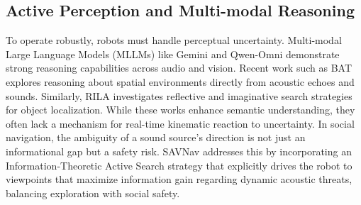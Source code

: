 \subsection{Active Perception and Multi-modal Reasoning}
To operate robustly, robots must handle perceptual uncertainty. Multi-modal Large Language Models (MLLMs) like Gemini \cite{Gemini31Pro2026} and Qwen-Omni \cite{Qwen3omniTechnicalReport2025} demonstrate strong reasoning capabilities across audio and vision. Recent work such as BAT \cite{BATLearningReason2024} explores reasoning about spatial environments directly from acoustic echoes and sounds. Similarly, RILA \cite{RILAReflectiveImaginative2024} investigates reflective and imaginative search strategies for object localization.
While these works enhance semantic understanding, they often lack a mechanism for real-time kinematic reaction to uncertainty. In social navigation, the ambiguity of a sound source's direction is not just an informational gap but a safety risk. SAVNav addresses this by incorporating an Information-Theoretic Active Search strategy that explicitly drives the robot to viewpoints that maximize information gain regarding dynamic acoustic threats, balancing exploration with social safety.
